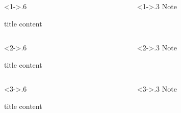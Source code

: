 \documentclass{beamer}
\begin{document}
\begin{frame}
    \begin{columns}
        \begin{column}<1->{.6\textwidth}
            \begin{block}{title}
                content
            \end{block}
        \end{column}
        \begin{column}<1->{.3\textwidth}
            Note
        \end{column}
    \end{columns}
    \begin{columns}
        \begin{column}<2->{.6\textwidth}
            \begin{alertblock}{title}
                content
            \end{alertblock}
        \end{column}
        \begin{column}<2->{.3\textwidth}
            Note
        \end{column}
    \end{columns}
    \begin{columns}
        \begin{column}<3->{.6\textwidth}
            \begin{exampleblock}{title}
                content
            \end{exampleblock}
        \end{column}
        \begin{column}<3->{.3\textwidth}
            Note
        \end{column}
    \end{columns}
\end{frame}
\end{document}
